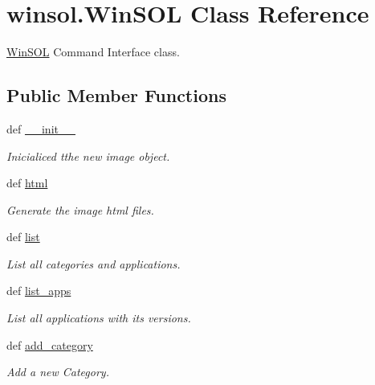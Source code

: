 \hypertarget{classwinsol_1_1WinSOL}{
\section{winsol.Win\-SOL Class Reference}
\label{classwinsol_1_1WinSOL}
}
\hyperlink{classwinsol_1_1WinSOL}{Win\-SOL} Command Interface class.  


\subsection*{Public Member Functions}
\begin{CompactItemize}
\item 
def \hyperlink{classwinsol_1_1WinSOL_809bc149b22893566e211c08fb3aaacb}{\_\-\_\-init\_\-\_\-}
\begin{CompactList}\small\item\em Inicialiced tthe new image object. \item\end{CompactList}\item 
def \hyperlink{classwinsol_1_1WinSOL_cfede741c471ea4d2ec9e0b823b4a23b}{html}
\begin{CompactList}\small\item\em Generate the image html files. \item\end{CompactList}\item 
def \hyperlink{classwinsol_1_1WinSOL_59c95792ce840bd4165507a3c4706e7e}{list}
\begin{CompactList}\small\item\em List all categories and applications. \item\end{CompactList}\item 
def \hyperlink{classwinsol_1_1WinSOL_c71c39f082dae8d131d6825f9cc63ccd}{list\_\-apps}
\begin{CompactList}\small\item\em List all applications with its versions. \item\end{CompactList}\item 
def \hyperlink{classwinsol_1_1WinSOL_4a0f8763ed2d6bae963048e7329398f4}{add\_\-category}
\begin{CompactList}\small\item\em Add a new Category. \item\end{CompactList}\item 

\end{CompactItemize}
